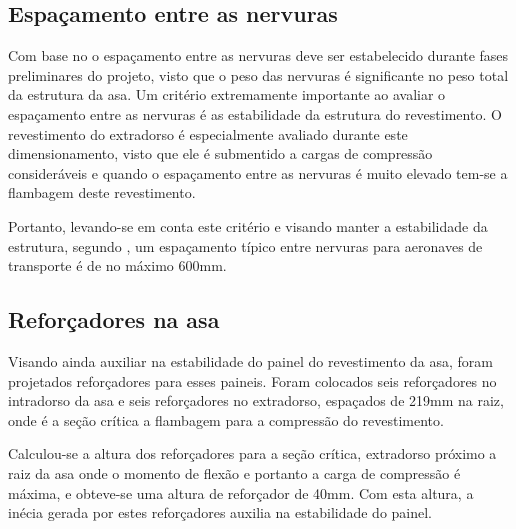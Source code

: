 \subsection{Espaçamento entre as nervuras}
Com base no \cite{niu1999airframe} o espaçamento entre as nervuras deve ser estabelecido durante fases preliminares do projeto, visto que o peso das nervuras é significante no peso total da estrutura da asa. Um critério extremamente importante ao avaliar o espaçamento entre as nervuras é as estabilidade da estrutura do revestimento. O revestimento do extradorso é especialmente avaliado durante este dimensionamento, visto que ele é submentido a cargas de compressão consideráveis e quando o espaçamento entre as nervuras é muito elevado tem-se a flambagem deste revestimento.

Portanto, levando-se em conta este critério e visando manter a estabilidade da estrutura, segundo \cite{roskam}, um espaçamento típico entre nervuras para aeronaves de transporte é de no máximo 600mm.

\subsection{Reforçadores na asa}
Visando ainda auxiliar na estabilidade do painel do revestimento da asa, foram projetados reforçadores para esses paineis. Foram colocados seis reforçadores no intradorso da asa e seis reforçadores no extradorso, espaçados de 219mm na raiz, onde é a seção crítica a flambagem para a compressão do revestimento.

Calculou-se a altura dos reforçadores para a seção crítica, extradorso próximo a raiz da asa onde o momento de flexão e portanto a carga de compressão é máxima, e obteve-se uma altura de reforçador de 40mm. Com esta altura, a inécia gerada por estes reforçadores auxilia na estabilidade do painel. 



